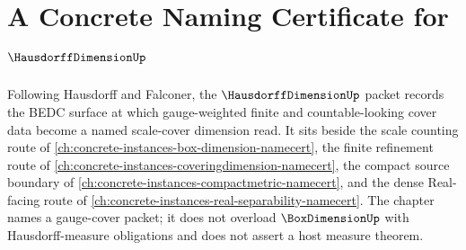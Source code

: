 \chapter{A Concrete Naming Certificate for $\HausdorffDimensionUp$}
\label{ch:concrete-instances-hausdorff-dimension-namecert}

Following Hausdorff and Falconer, the $\HausdorffDimensionUp$ packet records the BEDC surface at which gauge-weighted finite and countable-looking cover data become a named scale-cover dimension read. It sits beside the scale counting route of \autoref{ch:concrete-instances-box-dimension-namecert}, the finite refinement route of \autoref{ch:concrete-instances-coveringdimension-namecert}, the compact source boundary of \autoref{ch:concrete-instances-compactmetric-namecert}, and the dense Real-facing route of \autoref{ch:concrete-instances-real-separability-namecert}. The chapter names a gauge-cover packet; it does not overload $\BoxDimensionUp$ with Hausdorff-measure obligations and does not assert a host measure theorem.

